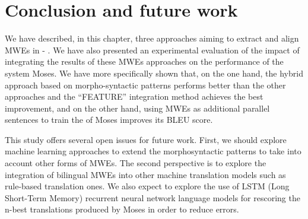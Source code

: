 \documentclass[output=paper,modfonts,nonflat]{langsci/langscibook}
\begin{document}
\section{Conclusion and future work}

We have described, in this chapter, three approaches aiming to extract and align MWEs in - . We have also presented an experimental evaluation of the impact of integrating the results of these MWEs  approaches on the performance of the  system Moses. We have more specifically shown that, on the one hand, the hybrid approach based on morpho-syntactic patterns performs better than the other approaches and the ``FEATURE'' integration method achieves the best improvement, and on the other hand, using MWEs as additional parallel sentences to train the  of Moses improves its BLEU score.

This study offers several open issues for future work. First, we should explore machine learning approaches to extend the morphosyntactic patterns to take into account other forms of MWEs. The second perspective is to explore the integration of bilingual MWEs into other machine translation models such as rule-based translation ones. We also expect to explore the use of LSTM (Long Short-Term Memory) recurrent neural network language models for rescoring the n-best translations produced by Moses in order to reduce  errors.



\end{document}
